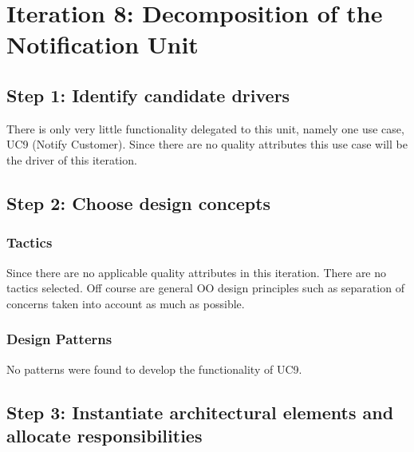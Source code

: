 \section{Iteration 8: Decomposition of the Notification Unit}
\label{add:it8}

\subsection{Step 1: Identify candidate drivers}
\label{add:it8/drivers}

\npar There is only very little functionality delegated to this unit, namely one
use case, UC9 (Notify Customer). Since there are no quality attributes this use
case will be the driver of this iteration.

\subsection{Step 2: Choose design concepts}
\label{add:it8/concepts}

\subsubsection{Tactics}
\label{add:it8/tactics}

\npar Since there are no applicable quality attributes in this iteration. There
are no tactics selected. Off course are general OO design principles such as
separation of concerns taken into account as much as possible.

\subsubsection{Design Patterns}
\label{add:it8/patterns}

\npar No patterns were found to develop the functionality of UC9.

\subsection{Step 3: Instantiate architectural elements and allocate responsibilities}
\label{add:it8/elements}

